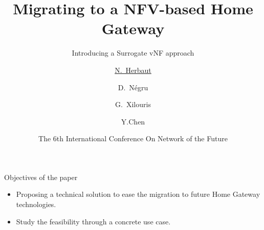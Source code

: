 \documentclass[a4paper]{beamer}
\title[Migrating to a NFV-based HomeGateway: the SvNF approach] %
{Migrating to a NFV-based Home Gateway}
\subtitle{Introducing a Surrogate vNF approach}
\author[\underline{Herbaut}, Negru, Xilouris, Chen] %
{\underline{N.~Herbaut\inst{1}} \and D.~Négru\inst{1} \and G.~Xilouris\inst{2} \and Y.Chen\inst{3} }
\institute %
{
  \inst{1}%
  Univ. Bordeaux, LaBRI\\
  Talence, France
  \and
  \inst{2}%
  NCSR Demokritos\\
  Athens, Greece
  \and
  \inst{3}%
  Orange Labs\\
  Issy-les-moulineaux, France 
}
\date[NOF2015] %
{The 6th International Conference On Network of the Future}
\begin{document}
\frame{\titlepage}


\begin{frame}{Objectives of the paper}
											
	\begin{itemize}
																					
		\item Proposing a technical solution to ease the migration to future Home Gateway technologies.
		      \pause
		\item Study the feasibility through a concrete use case.
	\end{itemize}
											
											
\end{frame}

\end{document}
